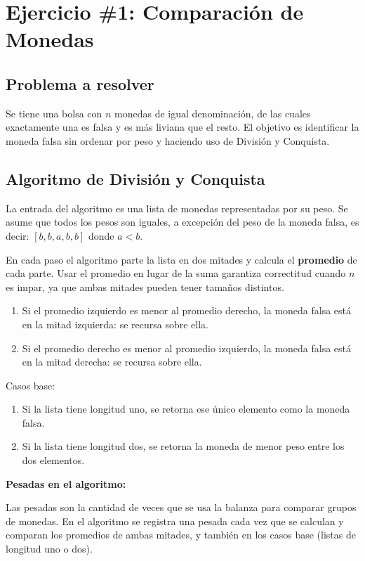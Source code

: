 \section{Ejercicio \#1: Comparación de Monedas}

\subsection{Problema a resolver}

Se tiene una bolsa con $n$ monedas de igual denominación, de las cuales exactamente una es falsa y es más liviana que el resto.
El objetivo es identificar la moneda falsa sin ordenar por peso y haciendo uso de División y Conquista.

\subsection{Algoritmo de División y Conquista}

La entrada del algoritmo es una lista de monedas representadas por su peso. Se asume que todos los pesos son iguales, a
excepción del peso de la moneda falsa, es decir: $[b, b, a, b, b]$ donde $a < b$.

En cada paso el algoritmo parte la lista en dos mitades y calcula el \textbf{promedio} de cada parte. Usar el promedio
en lugar de la suma garantiza correctitud cuando $n$ es impar, ya que ambas mitades pueden tener tamaños distintos.

\begin{enumerate}
	\item Si el promedio izquierdo es menor al promedio derecho, la moneda falsa está en la mitad izquierda: se recursa sobre ella.
	\item Si el promedio derecho es menor al promedio izquierdo, la moneda falsa está en la mitad derecha: se recursa sobre ella.
\end{enumerate}

Casos base:

\begin{enumerate}
	\item Si la lista tiene longitud uno, se retorna ese único elemento como la moneda falsa.
	\item Si la lista tiene longitud dos, se retorna la moneda de menor peso entre los dos elementos.
\end{enumerate}

\textbf{Pesadas en el algoritmo:}

Las pesadas son la cantidad de veces que se usa la balanza para comparar grupos de monedas. En el algoritmo se registra
una pesada cada vez que se calculan y comparan los promedios de ambas mitades, y también en los casos base (listas de
longitud uno o dos).

